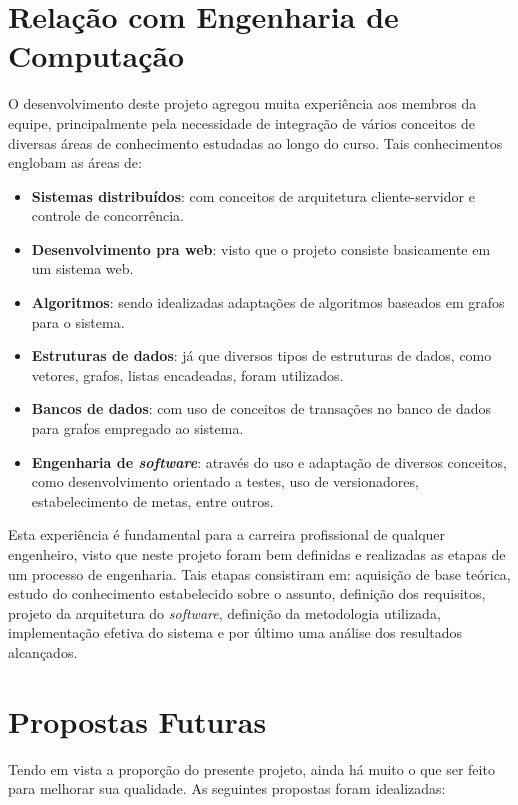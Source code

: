 \section{Relação com Engenharia de Computação}
O desenvolvimento deste projeto agregou muita experiência aos membros da equipe, principalmente pela necessidade de integração de vários conceitos de diversas áreas de conhecimento estudadas ao longo do curso.
Tais conhecimentos englobam as áreas de:
\begin{itemize}
	\item \textbf{Sistemas distribuídos}: com conceitos de arquitetura cliente-servidor e controle de concorrência.
	\item \textbf{Desenvolvimento pra web}: visto que o projeto consiste basicamente em um sistema web.
	\item \textbf{Algoritmos}: sendo idealizadas adaptações de algoritmos baseados em grafos para o sistema.
	\item \textbf{Estruturas de dados}: já que diversos tipos de estruturas de dados, como vetores, grafos, listas encadeadas, foram utilizados.
	\item \textbf{Bancos de dados}: com uso de conceitos de transações no banco de dados para grafos empregado ao sistema. 
	\item \textbf{Engenharia de \emph{software}}: através do uso e adaptação de diversos conceitos, como desenvolvimento orientado a testes, uso de versionadores, 			estabelecimento de metas, entre outros.
\end{itemize}

Esta experiência é fundamental para a carreira profissional de qualquer engenheiro, visto que neste projeto foram bem definidas e realizadas as etapas de um processo de engenharia. 
Tais etapas consistiram em: aquisição de base teórica, estudo do conhecimento estabelecido sobre o assunto, definição dos requisitos, projeto da arquitetura do \emph{software}, definição da metodologia utilizada, implementação efetiva do sistema e por último uma análise dos resultados alcançados. 

\section{Propostas Futuras}

Tendo em vista a proporção do presente projeto, ainda há muito o que ser feito para melhorar sua qualidade.
As seguintes propostas foram idealizadas:

